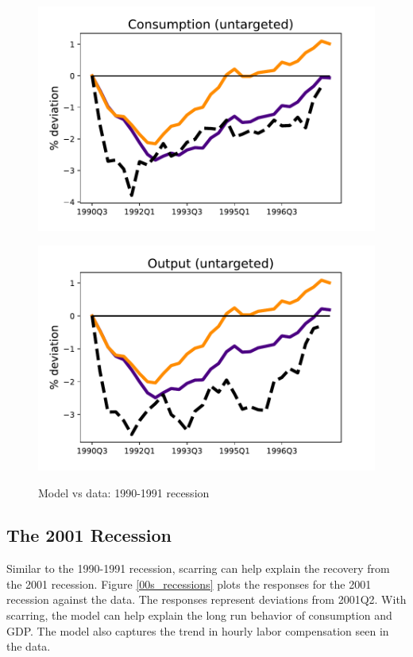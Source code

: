 \begin{figure}[H]
\medskip
\begin{minipage}{0.51\textwidth}
\includegraphics[scale=.57]{text/chapter1/Figures/90s/PCE_IPR_90s_83Q1}
\label{fig:c}
\end{minipage}\hspace*{\fill}
\begin{minipage}{0.51\textwidth}
\includegraphics[scale=.57]{text/chapter1/Figures/90s/GDP_IPR_90s_83Q1}
 \label{fig:d}
\end{minipage}
\caption{Model vs data: 1990-1991 recession}
\label{90s_recession}
\end{figure}

\hypertarget{The 2001 Recession}{}
\subsection{The 2001 Recession}

Similar to the 1990-1991 recession, scarring can help explain the recovery from the 2001 recession. Figure \ref{00s_recessions} plots the responses for the 2001 recession against the data. The responses represent deviations from 2001Q2. With scarring, the model can help explain the long run behavior of consumption and GDP. The model also captures the trend in hourly labor compensation seen in the data. 



